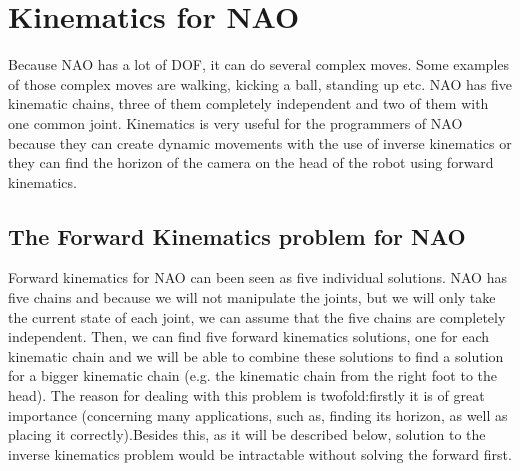 \newpage
\section{Kinematics for NAO}
Because NAO has a lot of DOF, it can do several complex moves. Some examples of those complex moves are walking, kicking a ball, standing up etc. NAO has five kinematic chains, three of them completely independent and two of them with one common joint. Kinematics is very useful for the programmers of NAO because they can create dynamic movements with the use of inverse kinematics or they can find the horizon of the camera on the head of the robot using forward kinematics.
\subsection{The Forward Kinematics problem for NAO}
Forward kinematics for NAO can been seen as five individual solutions. NAO has five chains and because we will not manipulate the joints, but we will only take the current state of each joint, we can assume that the five chains are completely independent. Then, we can find five forward kinematics solutions, one for each kinematic chain and we will be able to combine these solutions to find a solution for a bigger kinematic chain (e.g. the kinematic chain from the right foot to the head). The reason for dealing with this problem is twofold:firstly it is of great importance (concerning many applications, such as, finding its horizon, as well as placing it correctly).Besides this, as it will be described below, solution to the inverse kinematics problem would be intractable without solving the forward first.

